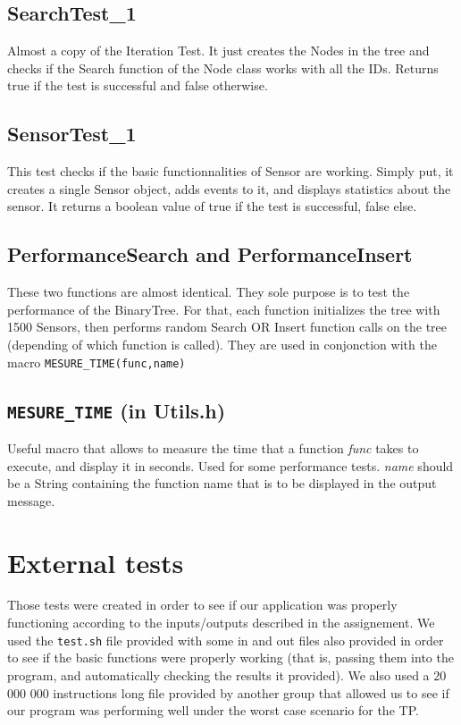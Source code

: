 \documentclass[10pt]{article}
\begin{document}
\subsection{SearchTest\_1}
Almost a copy of the Iteration Test. It just creates the Nodes in the tree and checks if the Search function of the Node class works with all the IDs. Returns true if the test is successful and false otherwise.

\subsection{SensorTest\_1}
This test checks if the basic functionnalities of Sensor are working. Simply put, it creates a single Sensor object, adds events to it, and displays statistics about the sensor. It returns a boolean value of true if the test is successful, false else.

\subsection{PerformanceSearch and PerformanceInsert}
These two functions are almost identical. They sole purpose is to test the performance of the BinaryTree. For that, each function initializes the tree with 1500 Sensors, then performs random Search OR Insert function calls on the tree (depending of which function is called). They are used in conjonction with the macro \texttt{MESURE\_TIME(func,name)}

\subsection{\texttt{MESURE\_TIME} (in Utils.h)}
Useful macro that allows to measure the time that a function \emph{func} takes to execute, and display it in seconds. Used for some performance tests. \emph{name} should be a String containing the function name that is to be displayed in the output message.

\section{External tests}
Those tests were created in order to see if our application was properly functioning according to the inputs/outputs described in the assignement. We used the \texttt{test.sh} file provided with some in and out files also provided in order to see if the basic functions were properly working (that is, passing them into the program, and automatically checking the results it provided). We also used a 20 000 000 instructions long file provided by another group that allowed us to see if our program was performing well under the worst case scenario for the TP.
\end{document}
